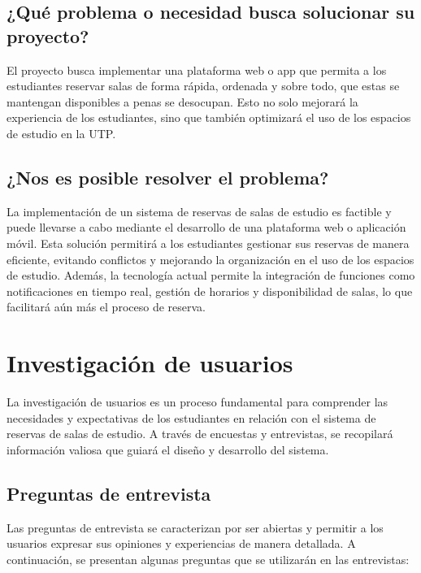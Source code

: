 \documentclass{article}
\begin{document}
\subsection{¿Qué problema o necesidad busca solucionar su proyecto?}

El proyecto busca implementar una plataforma web o app que permita a los estudiantes 
reservar salas de forma rápida, ordenada y sobre todo, que estas se mantengan disponibles a penas se desocupan. Esto no solo mejorará la experiencia de los estudiantes, sino que también optimizará el uso de los espacios de estudio en la UTP.

\subsection{¿Nos es posible resolver el problema?}

La implementación de un sistema de reservas de salas de estudio es factible y puede llevarse a cabo mediante el desarrollo de una plataforma web o aplicación móvil. Esta solución permitirá a los estudiantes gestionar sus reservas de manera eficiente, evitando conflictos y mejorando la organización en el uso de los espacios de estudio.
Además, la tecnología actual permite la integración de funciones como notificaciones en tiempo real, gestión de horarios y disponibilidad de salas, lo que facilitará aún más el proceso de reserva.

\newpage

\section{Investigación de usuarios}

La investigación de usuarios es un proceso fundamental para comprender las necesidades y expectativas de los estudiantes en relación con el sistema de reservas de salas de estudio. A través de encuestas y entrevistas, se recopilará información valiosa que guiará el diseño y desarrollo del sistema.
\vspace{-0.5cm}
\subsection{Preguntas de entrevista}

Las preguntas de entrevista se caracterizan por ser abiertas y permitir a los usuarios expresar sus opiniones y experiencias de manera detallada. A continuación, se presentan algunas preguntas que se utilizarán en las entrevistas:
\end{document}
